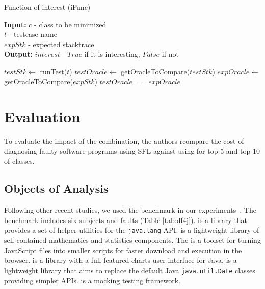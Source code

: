 \documentclass{article}
\begin{document}
\begin{algorithm}[h]
	\caption{Function of interest (iFunc)}
	\label{alg:finc}
	\begin{flushleft}
		\textbf{Input:} $c$ - class to be minimized\\
		\hspace{2.75em} $t$ - testcase name\\
		\hspace{2.75em} $expStk$ -  expected stacktrace\\
		\textbf{Output:} $interest$ - $True$ if it is interesting, $False$ if not \\
	\end{flushleft}
	\begin{algorithmic}[1]
		\State $testStk \leftarrow$ runTest($t$)
		\State $testOracle \leftarrow$ getOracleToCompare($testStk$)
		\State $expOracle \leftarrow$ getOracleToCompare($expStk$)
		\State \Return $testOracle$ == $expOracle$
		\EndFunction

	\end{algorithmic}

\end{algorithm}

\section{Evaluation}
\label{sec:eval}



To evaluate the impact of the \comb{} combination, the authors rcompare the cost of diagnosing faulty software programs using SFL against using \comb{} for top-5 and top-10 of classes.

\subsection{Objects of Analysis}

Following other recent studies, we used the \dfj{} benchmark in our
experiments~\cite{just-defects4j-issta2014}. The \dfj{} benchmark
includes six subjects and \numFaults{} faults (Table \ref{tab:df4j}).
\lang{} is a library
that provides a set of helper utilities for the {\small\texttt{java.lang}}
API. \cmath{} is a lightweight library of self-contained
mathematics and statistics components. The \closure{} is a toolset for
turning JavaScript files into smaller scripts for faster
download and execution in the browser. \chart{} is a library with a
full-featured charts user interface for Java. \jtime{} is a
lightweight library that aims to replace the default Java
{\small\texttt{java.util.Date}} classes providing simpler APIs. \mockito{} is
a mocking testing framework.
\end{document}
